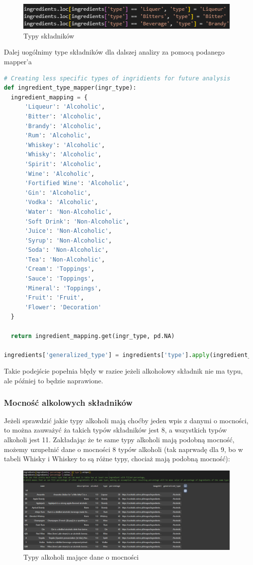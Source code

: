\documentclass{article}
\begin{document}
\begin{figure}[htbp]
\centering
    \includegraphics[width=0.6\linewidth]{ingredients_2.png}
    \caption{Typy składników}
\end{figure}

Dalej uogólnimy type składników dla dalszej analizy za pomocą podanego mapper'a
\begin{lstlisting}[language=Python]
# Creating less specific types of ingridients for future analysis
def ingredient_type_mapper(ingr_type):
  ingredient_mapping = {
      'Liqueur': 'Alcoholic',
      'Bitter': 'Alcoholic',
      'Brandy': 'Alcoholic',
      'Rum': 'Alcoholic',
      'Whiskey': 'Alcoholic',
      'Whisky': 'Alcoholic',
      'Spirit': 'Alcoholic',
      'Wine': 'Alcoholic',
      'Fortified Wine': 'Alcoholic',
      'Gin': 'Alcoholic',
      'Vodka': 'Alcoholic',
      'Water': 'Non-Alcoholic',
      'Soft Drink': 'Non-Alcoholic',
      'Juice': 'Non-Alcoholic',
      'Syrup': 'Non-Alcoholic',
      'Soda': 'Non-Alcoholic',
      'Tea': 'Non-Alcoholic',
      'Cream': 'Toppings',
      'Sauce': 'Toppings',
      'Mineral': 'Toppings',
      'Fruit': 'Fruit',
      'Flower': 'Decoration'
  }

  return ingredient_mapping.get(ingr_type, pd.NA)

ingredients['generalized_type'] = ingredients['type'].apply(ingredient_type_mapper)
\end{lstlisting}

Takie podejście popełnia błędy w raziee jeżeli alkoholowy składnik nie ma typu, ale później to będzie naprawione.



\subsubsection{Mocność alkolowych składników}
Jeżeli sprawdzić jakie typy alkoholi mają choćby jeden wpis z danymi o mocności, to można zauważyć ża takich typów składników jest 8, a wszystkich typów alkoholi jest 11. Zakładając że te same typy alkoholi mają podobną mocność, możemy uzupełnić dane o mocności 8 typów alkoholi (tak naprwadę dla 9, bo w tabeli Whisky i Whiskey to są różne typy, chociaż mają podobną mocność):

\begin{figure}[htbp]
\centering
    \includegraphics[width=1\linewidth]{ingredients_3.png}
    \caption{Typy alkoholi mające dane o mocności}
\end{figure}
\end{document}
